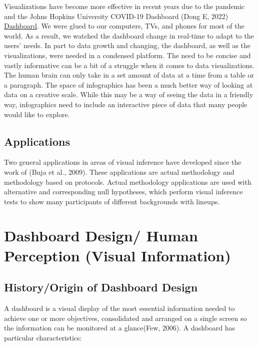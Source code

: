 \documentclass[print]{nuthesis}
\begin{document}
Visualizations have become more effective in recent years due to the pandemic and the Johns Hopkins University COVID-19 Dashboard (Dong E, 2022) \href{https://coronavirus.jhu.edu/map.html}{Dashboard}. We were glued to our computers, TVs, and phones for most of the world. As a result, we watched the dashboard change in real-time to adapt to the users' needs. In part to data growth and changing, the dashboard, as well as the visualizations, were needed in a condensed platform. The need to be concise and vastly informative can be a bit of a struggle when it comes to data visualizations. The human brain can only take in a set amount of data at a time from a table or a paragraph. The space of infographics has been a much better way of looking at data on a creative scale. While this may be a way of seeing the data in a friendly way, infographics need to include an interactive piece of data that many people would like to explore.

\hypertarget{applications}{%
\subsection{Applications}\label{applications}}

Two general applications in areas of visual inference have developed since the work of (Buja et al., 2009). These applications are actual methodology and methodology based on protocols. Actual methodology applications are used with alternative and corresponding null hypotheses, which perform visual inference tests to show many participants of different backgrounds with lineups.

\hypertarget{dashboard-design-human-perception-visual-information}{%
\section{Dashboard Design/ Human Perception (Visual Information)}\label{dashboard-design-human-perception-visual-information}}

\hypertarget{historyorigin-of-dashboard-design}{%
\subsection{History/Origin of Dashboard Design}\label{historyorigin-of-dashboard-design}}

A dashboard is a visual display of the most essential information needed to achieve one or more objectives, consolidated and arranged on a single screen so the information can be monitored at a glance(Few, 2006). A dashboard has particular characteristics:
\end{document}
